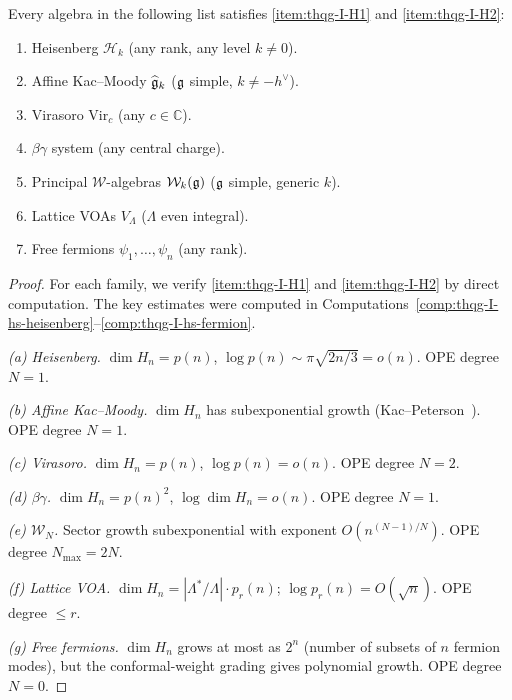\begin{proposition}
\label{prop:thqg-I-standard-hs}
Every algebra in the following list satisfies \ref{item:thqg-I-H1} and \ref{item:thqg-I-H2}:
\begin{enumerate}[label=\textup{(\alph*)}]
\item Heisenberg $\mathcal{H}_k$ (any rank, any level $k \neq 0$).
\item Affine Kac--Moody $\widehat{\mathfrak{g}}_k$ ($\mathfrak{g}$ simple, $k \neq -h^\vee$).
\item Virasoro $\mathrm{Vir}_c$ (any $c \in \mathbb{C}$).
\item $\beta\gamma$ system (any central charge).
\item Principal $\mathcal{W}$-algebras $\mathcal{W}_k(\mathfrak{g})$ ($\mathfrak{g}$ simple, generic $k$).
\item Lattice VOAs $V_\Lambda$ ($\Lambda$ even integral).
\item Free fermions $\psi_1, \ldots, \psi_n$ (any rank).
\end{enumerate}
\end{proposition}

\begin{proof}
For each family, we verify \ref{item:thqg-I-H1} and \ref{item:thqg-I-H2} by direct computation. The key estimates were computed in Computations~\ref{comp:thqg-I-hs-heisenberg}--\ref{comp:thqg-I-hs-fermion}.

\emph{(a) Heisenberg.} $\dim H_n = p(n)$, $\log p(n) \sim \pi\sqrt{2n/3} = o(n)$. OPE degree $N = 1$.

\emph{(b) Affine Kac--Moody.} $\dim H_n$ has subexponential growth (Kac--Peterson~\cite{KP84}). OPE degree $N = 1$.

\emph{(c) Virasoro.} $\dim H_n = p(n)$, $\log p(n) = o(n)$. OPE degree $N = 2$.

\emph{(d) $\beta\gamma$.} $\dim H_n = p(n)^2$, $\log \dim H_n = o(n)$. OPE degree $N = 1$.

\emph{(e) $\mathcal{W}_N$.} Sector growth subexponential with exponent $O(n^{(N-1)/N})$. OPE degree $N_{\max} = 2N$.

\emph{(f) Lattice VOA.} $\dim H_n = |\Lambda^*/\Lambda|\cdot p_r(n)$; $\log p_r(n) = O(\sqrt{n})$. OPE degree $\leq r$.

\emph{(g) Free fermions.} $\dim H_n$ grows at most as $2^n$ (number of subsets of $n$ fermion modes), but the conformal-weight grading gives polynomial growth. OPE degree $N = 0$.
\end{proof}

